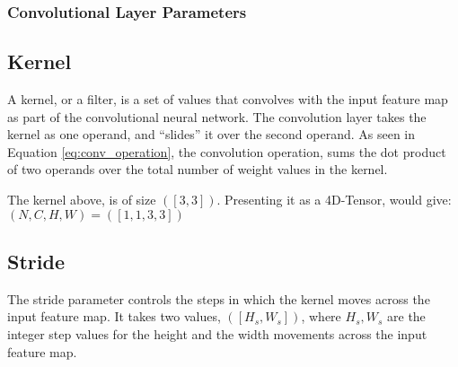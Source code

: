 \subsubsection{Convolutional Layer Parameters}
\subsection*{Kernel}
A kernel, or a filter, is a set of values that convolves with 
the input feature map
as part of the convolutional neural network. 
The convolution layer takes the kernel as one operand,
and ``slides'' it over the second operand. 
As seen in Equation \ref{eq:conv_operation}, 
the convolution operation, sums the dot product of two operands
over the total number of weight values in the kernel. 

\begin{figure}[H]
    \centering
\end{figure}

The kernel above, is of size \( \left( \left[ 3, 3 \right] \right) \).
Presenting it as a 4D-Tensor, would give: \( \left( N, C, H, W \right)  = \left( \left[ 1, 1, 3, 3 \right] \right)  \)
    

\subsection*{Stride}
The stride parameter controls the steps in which the kernel 
moves across the input feature map. 
It takes two values, \( \left( \left[ H_{s}, W_{s} \right] \right) \), 
where \( H_{s}, W_{s} \) are the integer step values for the 
height and the width movements across the input feature map.

